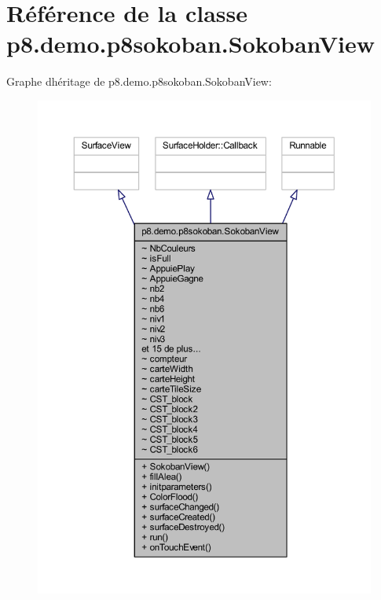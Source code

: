 \hypertarget{classp8_1_1demo_1_1p8sokoban_1_1_sokoban_view}{}\section{Référence de la classe p8.\+demo.\+p8sokoban.\+Sokoban\+View}
\label{classp8_1_1demo_1_1p8sokoban_1_1_sokoban_view}


Graphe d\textquotesingle{}héritage de p8.\+demo.\+p8sokoban.\+Sokoban\+View\+:
\nopagebreak
\begin{figure}[H]
\begin{center}
\leavevmode
\includegraphics[width=350pt]{classp8_1_1demo_1_1p8sokoban_1_1_sokoban_view__inherit__graph}
\end{center}
\end{figure}


